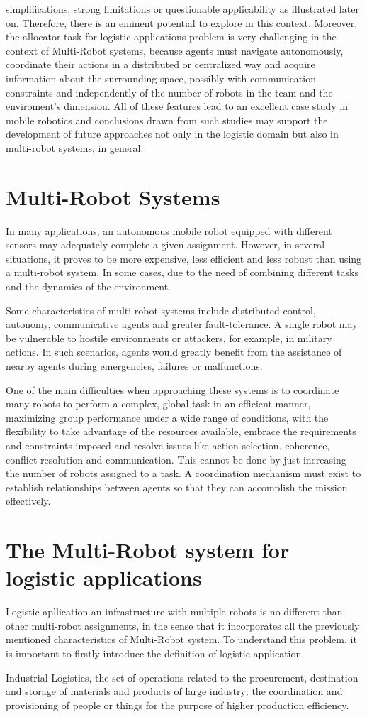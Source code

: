 simplifications, strong limitations or questionable applicability as illustrated later
on. Therefore, there is an eminent potential to explore in this context.
\newline
Moreover, the allocator task for logistic applications problem is very challenging
in the context of Multi-Robot systems, because agents must navigate autonomously,
coordinate their actions in a distributed or centralized way and acquire information
about the surrounding space, possibly with communication constraints and independently
of the number of robots in the team and the enviroment's dimension.
All of these features lead to an excellent case study in mobile robotics
and conclusions drawn from such studies may support the development of future
approaches not only in the logistic domain but also in multi-robot systems, in
general.

\section{Multi-Robot Systems}
In many applications, an autonomous mobile robot equipped with different
sensors may adequately complete a given assignment. However, in several situations,
it proves to be more expensive, less efficient and less robust than using a multi-robot system.
In some cases, due to the need of combining different tasks and the dynamics of the environment.

Some characteristics of multi-robot systems include distributed control, autonomy,
communicative agents and greater fault-tolerance.
A single robot may be vulnerable to hostile environments or attackers, for example, in military actions.
In such scenarios, agents would greatly benefit from the assistance of nearby agents during emergencies,
failures or malfunctions.

One of the main difficulties when approaching these systems is to coordinate
many robots to perform a complex, global task in an efficient manner, maximizing
group performance under a wide range of conditions, with the flexibility to take
advantage of the resources available, embrace the requirements and constraints
imposed and resolve issues like action selection, coherence, conflict resolution and
communication. This cannot be done by just increasing the number of robots
assigned to a task.
A coordination mechanism must exist to establish relationships between agents so
that they can accomplish the mission effectively.

\section{The Multi-Robot system for logistic applications}
Logistic apllication an infrastructure with multiple robots is no different than other multi-robot
assignments, in the sense that it incorporates all the previously mentioned
characteristics of Multi-Robot system. To understand this problem, it is important to firstly
introduce the definition of logistic application.

\begin{mydef}
    Industrial Logistics, the set of operations related to the procurement,
    destination and storage of materials and products of large industry; the coordination and provisioning of people or things for the purpose of higher production efficiency.
\end{mydef}







